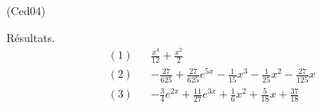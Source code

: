 \begin{tiny}(Ced04)\end{tiny} Résultats.
\begin{align*}
 &(1)& &\frac{x^4}{12} + \frac{x^2}{2}\\
 &(2)& &-\frac{27}{625}+\frac{27}{625}e^{5x}-\frac{1}{15}x^3-\frac{1}{25}x^2-\frac{27}{125}x\\
 &(3)& &-\frac{3}{4}e^{2x}+\frac{11}{27}e^{3x}+\frac{1}{6}x^2 + \frac{5}{18}x+\frac{37}{18}
 \end{align*}